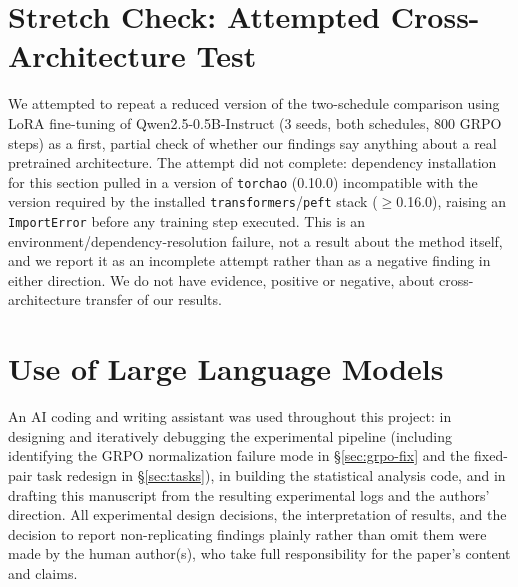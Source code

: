 \documentclass{article}
\begin{document}
\section{Stretch Check: Attempted Cross-Architecture Test}
\label{app:stretch}

We attempted to repeat a reduced version of the two-schedule comparison using
LoRA fine-tuning \citep{hu2022lora} of Qwen2.5-0.5B-Instruct
\citep{qwen2024qwen25} (3 seeds, both schedules, 800 GRPO steps) as a
first, partial check of whether our findings say anything about a real
pretrained architecture. The attempt did not complete: dependency
installation for this section pulled in a version of \texttt{torchao}
(0.10.0) incompatible with the version required by the installed
\texttt{transformers}/\texttt{peft} stack ($\geq$0.16.0), raising an
\texttt{ImportError} before any training step executed. This is an
environment/dependency-resolution failure, not a result about the method
itself, and we report it as an incomplete attempt rather than as a negative
finding in either direction. We do not have evidence, positive or negative,
about cross-architecture transfer of our results.

\section{Use of Large Language Models}
\label{app:llm}

An AI coding and writing assistant was used throughout this project: in
designing and iteratively debugging the experimental pipeline (including
identifying the GRPO normalization failure mode in \S\ref{sec:grpo-fix} and
the fixed-pair task redesign in \S\ref{sec:tasks}), in building the
statistical analysis code, and in drafting this manuscript from the resulting
experimental logs and the authors' direction. All experimental design
decisions, the interpretation of results, and the decision to report
non-replicating findings plainly rather than omit them were made by the human
author(s), who take full responsibility for the paper's content and claims.
\end{document}
